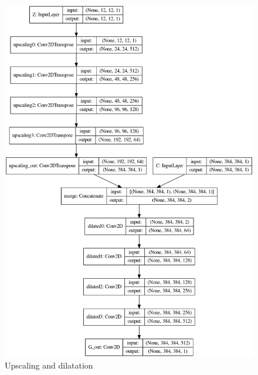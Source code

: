\documentclass{article}
\begin{document}
		\begin{figure}
		\centering
		\includegraphics[scale=0.45]{upscaling_dilated.png}
		\caption{Upscaling and dilatation}
		\end{figure}
	
\end{document}
